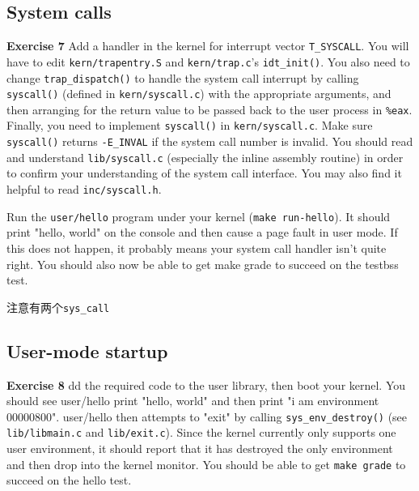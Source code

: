 \documentclass[11pt]{article}
\begin{document}
\subsection{System calls}
\begin{framed}
\noindent\textbf{Exercise 7} Add a handler in the kernel for interrupt vector \lstinline|T_SYSCALL|. You will have to edit \lstinline|kern/trapentry.S| and \lstinline|kern/trap.c|'s \lstinline|idt_init()|. You also need to change \lstinline|trap_dispatch()| to handle the system call interrupt by calling \lstinline|syscall()| (defined in \lstinline|kern/syscall.c|) with the appropriate arguments, and then arranging for the return value to be passed back to the user process in \lstinline|%eax|. Finally, you need to implement \lstinline|syscall()| in \lstinline|kern/syscall.c|. Make sure \lstinline|syscall()| returns \lstinline|-E_INVAL| if the system call number is invalid. You should read and understand \lstinline|lib/syscall.c| (especially the inline assembly routine) in order to confirm your understanding of the system call interface. You may also find it helpful to read \lstinline|inc/syscall.h|.

Run the \lstinline|user/hello| program under your kernel (\lstinline|make run-hello|). It should print "hello, world" on the console and then cause a page fault in user mode. If this does not happen, it probably means your system call handler isn't quite right. You should also now be able to get make grade to succeed on the testbss test.

\end{framed}
注意有两个\lstinline|sys_call|

\subsection{User-mode startup}
\begin{framed}
\noindent\textbf{Exercise 8} dd the required code to the user library, then boot your kernel. You should see user/hello print "hello, world" and then print "i am environment 00000800". user/hello then attempts to "exit" by calling \lstinline|sys_env_destroy()| (see \lstinline|lib/libmain.c| and \lstinline|lib/exit.c|). Since the kernel currently only supports one user environment, it should report that it has destroyed the only environment and then drop into the kernel monitor. You should be able to get \lstinline|make grade| to succeed on the hello test. 
\end{framed}
\end{document}
